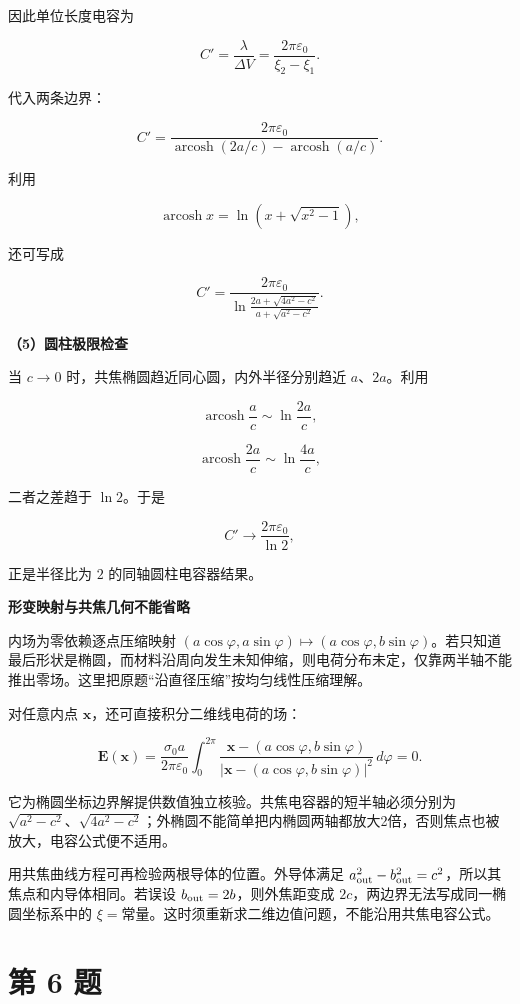 \documentclass[12pt,a4paper,UTF8]{ctexart}
\begin{document}
因此单位长度电容为

\[\boxed{
C'=\frac\lambda{\Delta V}
=\frac{2\pi\varepsilon_0}{\xi_2-\xi_1}
}.\]

代入两条边界：

\[\boxed{
C'=\frac{2\pi\varepsilon_0}
{\operatorname{arcosh}(2a/c)-\operatorname{arcosh}(a/c)}
}.\]

利用

\[\operatorname{arcosh}x=\ln\left(x+\sqrt{x^2-1}\right),\]

还可写成

\[\boxed{
C'=\frac{2\pi\varepsilon_0}
{\displaystyle
\ln\frac{2a+\sqrt{4a^2-c^2}}
{a+\sqrt{a^2-c^2}}}
}.\]

\textbf{（5）圆柱极限检查}

当 \(c\to0\) 时，共焦椭圆趋近同心圆，内外半径分别趋近
\(a\)、\(2a\)。利用

\[\operatorname{arcosh}\frac ac\sim\ln\frac{2a}{c},\]

\[\operatorname{arcosh}\frac{2a}{c}\sim\ln\frac{4a}{c},\]

二者之差趋于 \(\ln2\)。于是

\[C'\to\frac{2\pi\varepsilon_0}{\ln2},\]

正是半径比为 \(2\) 的同轴圆柱电容器结果。

\textbf{形变映射与共焦几何不能省略}

内场为零依赖逐点压缩映射
\((a\cos\varphi,a\sin\varphi)\mapsto(a\cos\varphi,b\sin\varphi)\)。若只知道最后形状是椭圆，而材料沿周向发生未知伸缩，则电荷分布未定，仅靠两半轴不能推出零场。这里把原题``沿直径压缩''按均匀线性压缩理解。

对任意内点 \(\bm x\)，还可直接积分二维线电荷的场：

\[\bm E(\bm x)=\frac{\sigma_0a}{2\pi\varepsilon_0}
\int_0^{2\pi}\frac{\bm x-(a\cos\varphi,b\sin\varphi)}
{|\bm x-(a\cos\varphi,b\sin\varphi)|^2}\,d\varphi=0.\]

它为椭圆坐标边界解提供数值独立核验。共焦电容器的短半轴必须分别为
\(\sqrt{a^2-c^2}\)、\(\sqrt{4a^2-c^2}\)；外椭圆不能简单把内椭圆两轴都放大2倍，否则焦点也被放大，电容公式便不适用。

用共焦曲线方程可再检验两根导体的位置。外导体满足
\(a_{\rm out}^2-b_{\rm out}^2=c^2\)，所以其焦点和内导体相同。若误设
\(b_{\rm out}=2b\)，则外焦距变成
\(2c\)，两边界无法写成同一椭圆坐标系中的
\(\xi=\text{常量}\)。这时须重新求二维边值问题，不能沿用共焦电容公式。

\newpage

\section{第 6 题}\label{ux7b2c-6-ux9898}
\end{document}
